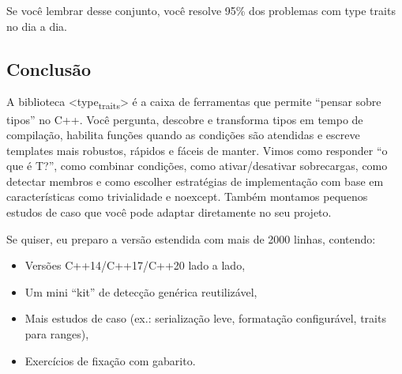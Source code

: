 \documentclass[11pt]{article}
\begin{document}
Se você lembrar desse conjunto, você resolve 95\% dos problemas com type traits no dia a dia.
\subsection{Conclusão}
\label{sec:org5c44123}

A biblioteca <type\textsubscript{traits}> é a caixa de ferramentas que permite “pensar sobre tipos” no C++. Você pergunta, descobre e transforma tipos em tempo de compilação, habilita funções quando as condições são atendidas e escreve templates mais robustos, rápidos e fáceis de manter. Vimos como responder “o que é T?”, como combinar condições, como ativar/desativar sobrecargas, como detectar membros e como escolher estratégias de implementação com base em características como trivialidade e noexcept. Também montamos pequenos estudos de caso que você pode adaptar diretamente no seu projeto.

Se quiser, eu preparo a versão estendida com mais de 2000 linhas, contendo:
\begin{itemize}
\item Versões C++14/C++17/C++20 lado a lado,
\item Um mini “kit” de detecção genérica reutilizável,
\item Mais estudos de caso (ex.: serialização leve, formatação configurável, traits para ranges),
\end{itemize}
\begin{itemize}
\item Exercícios de fixação com gabarito.
\end{itemize}
\end{document}
